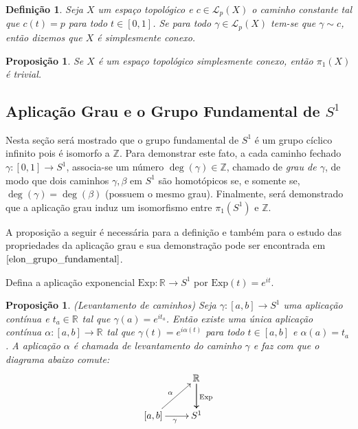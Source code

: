\documentclass[12pt]{book}
\newtheorem{definicao}[teorema]{Definição}
\newtheorem{proposicao}[teorema]{Proposição}
\newcommand{\caminhos}{\mathcal{L}}
\newcommand{\caminhospontobasegeral}[2]{\caminhos_{#1}(#2)}
\newcommand{\circulo}{S^{1}}
\newcommand{\Exp}{\text{Exp}}
\newcommand{\grupofundamental}[1]{\pi_{1}(#1)}
\newcommand{\inteiros}{\mathbb{Z}}
\newcommand{\intervalo}{[0,1]}
\newcommand{\real}[1]{\mathbb{R}^{#1}}
\newcommand{\reta}{\real{}}
\begin{document}
	\begin{definicao}
		Seja $X$ um espaço topológico e
		$c \in \caminhospontobasegeral{p}{X}$ o caminho constante tal que $c(t) = p$ para todo $t \in \intervalo$. Se para todo $\gamma \in \caminhospontobasegeral{p}{X}$ tem-se que $\gamma \sim c$, então dizemos que $X$ é simplesmente conexo.
	\end{definicao}
	
	\begin{proposicao}\label{proposicao_grupo_fundamental_simplesmente_conexo}
		Se $X$ é um espaço topológico simplesmente conexo, então $\grupofundamental{X}$ é trivial.
	\end{proposicao}
	
	\subsection{Aplicação Grau e o Grupo Fundamental de $\circulo$}
	Nesta seção será mostrado que o grupo fundamental de $S^{1}$ é um grupo cíclico infinito pois é isomorfo a $\inteiros$. Para demonstrar este fato, a cada caminho fechado $\gamma:[0,1] \to S^{1}$, associa-se um número $\deg(\gamma) \in \inteiros$, chamado de \textit{grau de $\gamma$}, de modo que dois caminhos $\gamma, \beta$ em $S^{1}$ são homotópicos se, e somente se, $\deg(\gamma) = \deg(\beta)$ (possuem o mesmo grau). Finalmente, será demonstrado que a aplicação grau induz um isomorfismo entre $\pi_{1}(S^{1})$ e $\inteiros$.
	
	A proposição a seguir é necessária para a definição e também para o estudo das propriedades da aplicação grau e sua demonstração pode ser encontrada em $\cite{elon_grupo_fundamental}$.
	
	Defina a aplicação exponencial $\Exp: \reta\to \circulo$ por $\Exp(t) = e^{it}$.
	
	\begin{proposicao}\label{proposicao_levantamento_curvas}
		(Levantamento de caminhos) Seja $\gamma:[a,b] \to S^{1}$ uma aplicação contínua e $t_{a}\in \real{}$ tal que $\gamma(a) = e^{it_{a}}$. Então existe uma única aplicação contínua $\alpha:[a,b] \to \real{}$ tal que $\gamma(t) = e^{i\alpha(t)}$ para todo $t\in [a,b]$ e $\alpha(a) = t_{a}$. A aplicação $\alpha$ é chamada de levantamento do caminho $\gamma$ e faz com que o diagrama abaixo comute:
		$$
		\xymatrix{
			& \real{}\ar[d]\ar[d]^{\Exp}
			\\
			[a,b]\ar[ur]^{\alpha} \ar[r]_{\gamma} & S^{1}
		}
		$$
	\end{proposicao}
	
\end{document}
